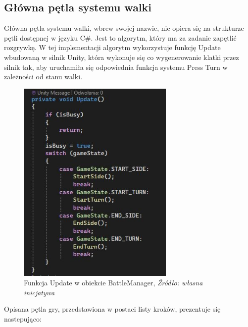 \documentclass{SGGW-thesis}
\begin{document}
\subsection{Główna pętla systemu walki}
Główna pętla systemu walki, wbrew swojej nazwie, nie opiera się na strukturze pętli dostępnej w języku C\#. Jest to algorytm, który ma za zadanie zapętlić rozgrywkę.
W tej implementacji algorytm wykorzystuje funkcję Update wbudowaną w silnik Unity, która wykonuje się co wygenerowanie klatki przez silnik tak, aby uruchamiła się odpowiednia funkcja systemu Press Turn w zależności od stanu walki.
\begin{figure}[H]
  \centering
  \includegraphics[height=10cm]{updatebattle.JPG}
  \addtocounter{figure}{8}
  \caption{Funkcja Update w obiekcie BattleManager, \textit{Źródło: własna inicjatywa}}
\end{figure}
\pagebreak
Opisana pętla gry, przedstawiona w postaci listy kroków, prezentuje się nastepująco:
\end{document}
